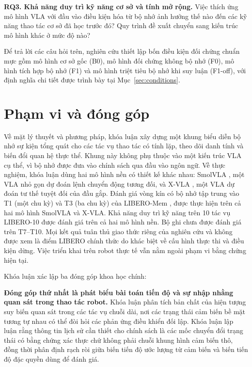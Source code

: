 \textbf{RQ3. Khả năng duy trì kỹ năng cơ sở và tính mở rộng.} Việc thích ứng mô hình VLA với đầu vào điều kiện hóa từ bộ nhớ ảnh hưởng thế nào đến các kỹ năng thao tác cơ sở đã học trước đó? Quy trình đề xuất chuyển sang kiến trúc mô hình khác ở mức độ nào?

Để trả lời các câu hỏi trên, nghiên cứu thiết lập bốn điều kiện đối chứng chuẩn mực gồm mô hình cơ sở gốc (B0), mô hình đối chứng không bộ nhớ (F0), mô hình tích hợp bộ nhớ (F1) và mô hình triệt tiêu bộ nhớ khi suy luận (F1-off), với định nghĩa chi tiết được trình bày tại Mục~\ref{sec:conditions}.

\section{Phạm vi và đóng góp}

Về mặt lý thuyết và phương pháp, khóa luận xây dựng một khung biểu diễn bộ nhớ sự kiện tổng quát cho các tác vụ thao tác có tính lặp, theo dõi danh tính và biến đổi quan hệ thực thể. Khung này không phụ thuộc vào một kiến trúc VLA cụ thể, vì bộ nhớ được đưa vào chính sách qua đầu vào ngôn ngữ. Về thực nghiệm, khóa luận dùng hai mô hình nền có thiết kế khác nhau: SmolVLA \cite{smolvla2025}, một VLA nhỏ gọn dự đoán lệnh chuyển động tương đối, và X-VLA \cite{xvla2025}, một VLA dự đoán tư thế tuyệt đối của đầu gắp. Đánh giá vòng kín có bộ nhớ tập trung vào T1 (một chu kỳ) và T3 (ba chu kỳ) của LIBERO-Mem \cite{liberomemSource}, được thực hiện trên cả hai mô hình SmolVLA và X-VLA. Khả năng duy trì kỹ năng trên 10 tác vụ LIBERO-10 \cite{liberoSource} được đánh giá trên cả hai mô hình nền. Bộ ghi chưa được đánh giá trên T7--T10. Mọi kết quả tuân thủ giao thức riêng của nghiên cứu và không được xem là điểm LIBERO chính thức do khác biệt về cấu hình thực thi và điều kiện dừng. Việc triển khai trên robot thực tế vẫn nằm ngoài phạm vi bằng chứng hiện tại.

Khóa luận xác lập ba đóng góp khoa học chính:

\textbf{Đóng góp thứ nhất là phát biểu bài toán tiến độ và sự nhập nhằng quan sát trong thao tác robot.} Khóa luận phân tích bản chất của hiện tượng suy biến quan sát trong các tác vụ chuỗi dài, nơi các trạng thái cảm biến bề mặt tương tự nhau có thể đòi hỏi các phản ứng điều khiển đối lập. Khóa luận lập luận rằng thông tin lịch sử cần thiết cho chính sách là các mốc chuyển đổi trạng thái có bằng chứng xác thực chứ không phải chuỗi khung hình cảm biến thô, đồng thời phân định rạch ròi giữa biến tiến độ ước lượng từ cảm biến và biến tiến độ đặc quyền dùng để đánh giá.

